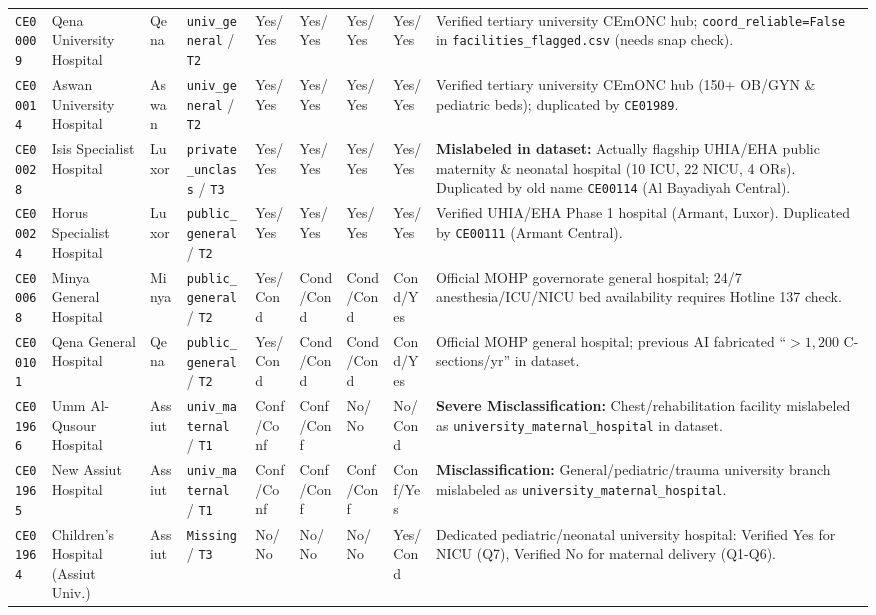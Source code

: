 \documentclass[10pt,a4paper]{article}
\begin{document}
{\begin{longtable}{p{1.05cm} p{2.7cm} p{1.1cm} p{1.95cm} p{0.95cm} p{0.95cm} p{0.95cm} p{0.95cm} p{3.4cm}}
\texttt{CE00009} & Qena University Hospital & Qena & \texttt{univ\_general} / \texttt{T2} & Yes/Yes & Yes/Yes & Yes/Yes & Yes/Yes & Verified tertiary university CEmONC hub; \texttt{coord\_reliable=False} in \texttt{facilities\_flagged.csv} (needs snap check). \\[0.3em]
\texttt{CE00014} & Aswan University Hospital & Aswan & \texttt{univ\_general} / \texttt{T2} & Yes/Yes & Yes/Yes & Yes/Yes & Yes/Yes & Verified tertiary university CEmONC hub (150+ OB/GYN \& pediatric beds); duplicated by \texttt{CE01989}. \\[0.3em]
\texttt{CE00028} & Isis Specialist Hospital & Luxor & \texttt{private\_unclass} / \texttt{T3} & Yes/Yes & Yes/Yes & Yes/Yes & Yes/Yes & \textbf{Mislabeled in dataset:} Actually flagship UHIA/EHA public maternity \& neonatal hospital (10 ICU, 22 NICU, 4 ORs). Duplicated by old name \texttt{CE00114} (Al Bayadiyah Central). \\[0.3em]
\texttt{CE00024} & Horus Specialist Hospital & Luxor & \texttt{public\_general} / \texttt{T2} & Yes/Yes & Yes/Yes & Yes/Yes & Yes/Yes & Verified UHIA/EHA Phase 1 hospital (Armant, Luxor). Duplicated by \texttt{CE00111} (Armant Central). \\[0.3em]
\texttt{CE00068} & Minya General Hospital & Minya & \texttt{public\_general} / \texttt{T2} & Yes/Cond & Cond/Cond & Cond/Cond & Cond/Yes & Official MOHP governorate general hospital; 24/7 anesthesia/ICU/NICU bed availability requires Hotline 137 check. \\[0.3em]
\texttt{CE00101} & Qena General Hospital & Qena & \texttt{public\_general} / \texttt{T2} & Yes/Cond & Cond/Cond & Cond/Cond & Cond/Yes & Official MOHP general hospital; previous AI fabricated ``$>1,200$ C-sections/yr'' in dataset. \\[0.3em]
\texttt{CE01966} & Umm Al-Qusour Hospital & Assiut & \texttt{univ\_maternal} / \texttt{T1} & Conf/Conf & Conf/Conf & No/No & No/Cond & \textbf{Severe Misclassification:} Chest/rehabilitation facility mislabeled as \texttt{university\_maternal\_hospital} in dataset. \\[0.3em]
\texttt{CE01965} & New Assiut Hospital & Assiut & \texttt{univ\_maternal} / \texttt{T1} & Conf/Conf & Conf/Conf & Conf/Conf & Conf/Yes & \textbf{Misclassification:} General/pediatric/trauma university branch mislabeled as \texttt{university\_maternal\_hospital}. \\[0.3em]
\texttt{CE01964} & Children's Hospital (Assiut Univ.) & Assiut & \texttt{Missing} / \texttt{T3} & No/No & No/No & No/No & Yes/Cond & Dedicated pediatric/neonatal university hospital: Verified Yes for NICU (Q7), Verified No for maternal delivery (Q1-Q6). \\[0.3em]

\end{longtable}}
\end{document}
